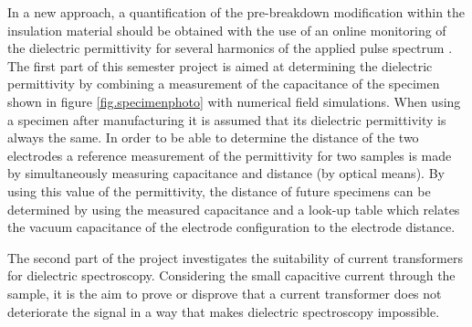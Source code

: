 In a new approach, a quantification of the pre-breakdown modification within the insulation material should be obtained with the use of an online monitoring of the dielectric permittivity for several harmonics of the applied pulse spectrum \cite{FaerberMVISS}.
The first part of this semester project is aimed at determining the dielectric permittivity by combining a measurement of the capacitance of the specimen shown in figure \ref{fig.specimenphoto} with numerical field simulations. When using a specimen after manufacturing it is assumed that its dielectric permittivity is always the same. In order to be able to determine the distance of the two electrodes a reference measurement of the permittivity for two samples is made by simultaneously measuring capacitance and distance (by optical means). By using this value of the permittivity, the distance of future specimens can be determined by using the measured capacitance and a look-up table which relates the vacuum capacitance of the electrode configuration to the electrode distance. 

The second part of the project investigates the suitability of current transformers for dielectric spectroscopy. Considering the small capacitive current through the sample, it is the aim to prove or disprove that a current transformer does not deteriorate the signal in a way that makes dielectric spectroscopy impossible. 


